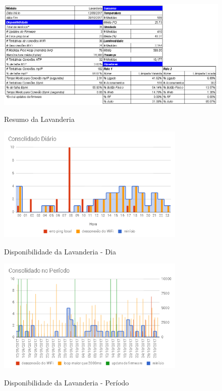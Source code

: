 \begin{figure}[H]
	\centering
	\caption{Resumo da Lavanderia}
	\includegraphics[width=1.0\textwidth]{resumoLavanderia}
	\label{fig:resumoLavanderia}
\end{figure}

\begin{figure}[H]
	\centering
	\caption{Disponibilidade da Lavanderia - Dia}
	\includegraphics[width=0.8\textwidth]{lavanderiadiadisp}
	\label{fig:lavanderiadiadisp}
\end{figure}

\begin{figure}[H]
	\centering
	\caption{Disponibilidade da Lavanderia - Período}
	\includegraphics[width=0.8\textwidth]{lavanderiaperiododisp}
	\label{fig:lavanderiaperiododisp}
\end{figure}

